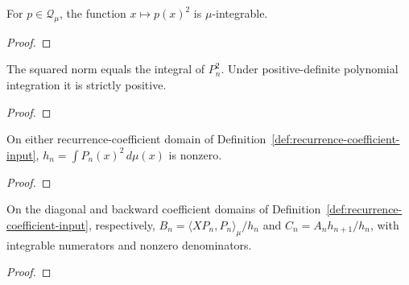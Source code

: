 \begin{supporting}

\begin{theorem}
\label{thm:integrable-polynomial-square}
\leanok
For $p\in\mathcal Q_\mu$, the function $x\mapsto p(x)^2$ is
$\mu$-integrable.
\end{theorem}
\begin{proof}
\leanok
\end{proof}

\begin{theorem}
\label{thm:general-squared-norm}
\leanok
The squared norm equals the integral of $P_n^2$.
Under positive-definite polynomial integration it is strictly positive.
\end{theorem}
\begin{proof}
\leanok
\end{proof}

\begin{theorem}
\label{thm:recurrence-coefficient-input}
\leanok
On either recurrence-coefficient domain of
Definition~\ref{def:recurrence-coefficient-input},
$h_n=\int P_n(x)^2\,d\mu(x)$ is nonzero.
\end{theorem}
\begin{proof}
\leanok
\end{proof}

\begin{theorem}
\label{thm:recurrence-coefficient-characterisation}
\leanok
On the diagonal and backward coefficient domains of Definition~\ref{def:recurrence-coefficient-input}, respectively,
$B_n=\langle XP_n,P_n\rangle_\mu/h_n$ and
$C_n=A_nh_{n+1}/h_n$, with integrable numerators and nonzero denominators.
\end{theorem}
\begin{proof}
\leanok
\end{proof}


\end{supporting}
